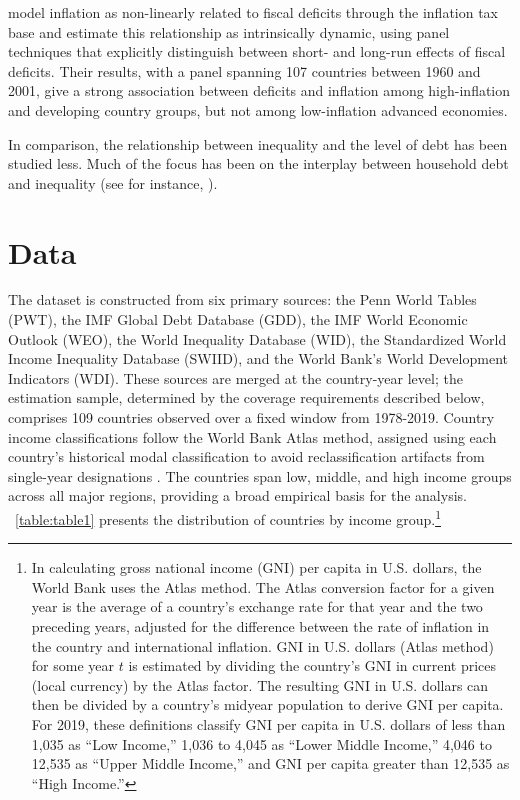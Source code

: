 \documentclass[12pt, titlepage]{article}
\numberwithin{equation}{section}
\begin{document}
	\cite{Catao2005} model inflation as non-linearly related to fiscal deficits through the inflation tax base and estimate this relationship as intrinsically dynamic, using panel techniques that explicitly distinguish between short- and long-run effects of fiscal deficits. Their results, with a panel spanning 107 countries between 1960 and 2001, give a strong association between deficits and inflation among high-inflation and developing country groups, but not among low-inflation advanced economies.


	In comparison, the relationship between inequality and the level of debt has been studied less. Much of the focus has been on the interplay between household debt and inequality (see for instance, \cite{Iacoviello2008, Mason2014, Kumhof2015}).

\section{Data}
\label{section:data}

The dataset is constructed from six primary sources: the Penn World Tables (PWT),
the IMF Global Debt Database (GDD), the IMF World Economic Outlook (WEO), the World
Inequality Database (WID), the Standardized World Income Inequality Database (SWIID), and
the World Bank's World Development Indicators (WDI). These sources are merged at
the country-year level; the estimation sample, determined by the coverage
requirements described below, comprises 109 countries observed over a fixed
window from 1978-2019. Country income classifications follow the World Bank
Atlas method, assigned using each country's historical modal classification
to avoid reclassification artifacts from single-year designations
\citep{WorldBankClassifications}. The countries span low, middle, and high
income groups across all major regions, providing a broad empirical basis for
the analysis. ~\autoref{table:table1} presents the distribution of countries
by income group.\footnote{In calculating gross
	national income (GNI) per capita in U.S. dollars, the World Bank uses the
	Atlas method. The Atlas conversion factor for a given year is the average of
	a country's exchange rate for that year and the two preceding years, adjusted
	for the difference between the rate of inflation in the country and
	international inflation. GNI in U.S. dollars (Atlas method) for some year $t$
	is estimated by dividing the country's GNI in current prices (local currency)
	by the Atlas factor. The resulting GNI in U.S. dollars can then be divided by
	a country's midyear population to derive GNI per capita. For 2019, these
	definitions classify GNI per capita in U.S. dollars of less than 1,035 as
	``Low Income,'' 1,036 to 4,045 as ``Lower Middle Income,'' 4,046 to 12,535 as
	``Upper Middle Income,'' and GNI per capita greater than 12,535 as ``High
	Income.''}
\end{document}
